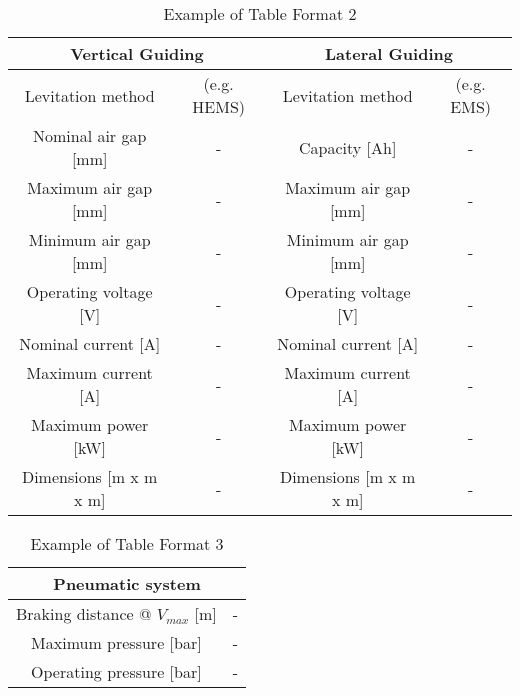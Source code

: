 \begin{table}[H]
\centering
\begin{tabular}{|c|c|c|c|}
\hline
    \multicolumn{2}{|c|}{\textcolor{ehwBlue}{\textbf{Vertical Guiding}}} & \multicolumn{2}{c|}{\textcolor{ehwBlue}{\textbf{Lateral Guiding}}}\\ \hline
    Levitation method & (e.g. HEMS) & Levitation method & (e.g. EMS) \\\hline
    Nominal air gap [mm] & - & Capacity [Ah] & - \\\hline
    Maximum air gap [mm] & - & Maximum air gap [mm] & - \\\hline
    Minimum air gap [mm]  & - & Minimum air gap [mm] & -  \\\hline
    Operating voltage [V] & - &  Operating voltage [V] & -  \\\hline
    Nominal current [A] & - & Nominal current [A] & - \\\hline
    Maximum current [A] & - & Maximum current [A] & - \\\hline
    Maximum power [kW] & - & Maximum power [kW] & - \\\hline
    Dimensions [m x m x m] & - & Dimensions [m x m x m] & - \\\hline
    
\end{tabular}
\caption{Example of Table Format 2}
\label{tab:Tab2}
\end{table}

\begin{table}[H]
    \centering
    \begin{tabular}{|c|c|}
    \hline
        \multicolumn{2}{|c|}{\textcolor{ehwBlue}{\textbf{Pneumatic system}}}\\ \hline
        Braking distance @ $V_{max}$ [m] & - \\\hline 
        Maximum pressure [bar] & -\\\hline 
        Operating pressure [bar] & - \\ \hline 
        \end{tabular}
    \caption{Example of Table Format 3}
    \label{tab:Tab3}
\end{table}

